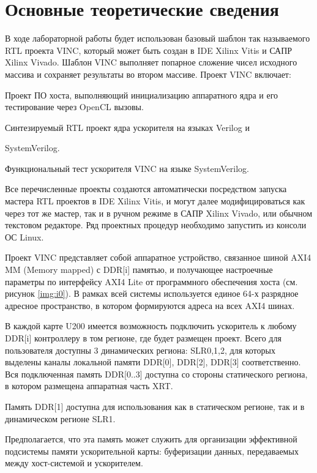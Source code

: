 \chapter*{Основные теоретические сведения}
В ходе лабораторной работы будет использован базовый шаблон так называемого RTL проекта VINC, который может быть создан в IDE Xilinx Vitis и САПР Xilinx Vivado. Шаблон VINC выполняет попарное сложение чисел исходного массива и сохраняет результаты во втором массиве. Проект VINC включает:

Проект ПО хоста, выполняющий инициализацию аппаратного ядра и его тестирование через OpenCL вызовы.

Синтезируемый RTL проект ядра ускорителя на языках Verilog и

 SystemVerilog.

Функциональный тест ускорителя VINC на языке SystemVerilog.

Все перечисленные проекты создаются автоматически посредством запуска мастера RTL проектов в IDE Xilinx Vitis, и могут далее модифицироваться как через тот же мастер, так и в ручном режиме в САПР Xilinx Vivado, или обычном текстовом редакторе. Ряд проектных процедур необходимо запустить из консоли ОС Linux.

Проект VINC представляет собой аппаратное устройство, связанное шиной AXI4 MM (Memory mapped) с DDR[i] памятью, и получающее настроечные параметры по интерфейсу AXI4 Lite от программного обеспечения хоста (см. рисунок \ref{img:i0}). В рамках всей системы используется единое 64-х разрядное адресное пространство, в котором формируются адреса на всех AXI4 шинах.


В каждой карте U200 имеется возможность подключить ускоритель к любому DDR[i] контроллеру в том регионе, где будет размещен проект. Всего для пользователя доступны 3 динамических региона: SLR0,1,2, для которых выделены каналы локальной памяти DDR[0], DDR[2], DDR[3] соответственно. Вся подключенная память DDR[0..3] доступна со стороны статического региона, в котором размещена аппаратная часть XRT.

Память DDR[1] доступна для использования как в статическом регионе, так и в динамическом регионе SLR1.

Предполагается, что эта память может служить для организации эффективной подсистемы памяти ускорительной карты: буферизации данных, передаваемых между хост-системой и ускорителем.